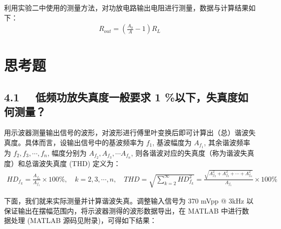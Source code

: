 \documentclass[UTF8]{article}
\begin{document}
利用实验二中使用的测量方法，对功放电路输出电阻进行测量，数据与计算结果如下：
\begin{gather}
    R_{out} = \left(\frac{A_0}{A} - 1\right)R_L 
\end{gather}


\begin{table}[H]\centering
    \caption{等效输出电阻测量数据与计算结果}
    \label{等效输出电阻测量数据与计算结果}
\end{table}



\section{思考题}

\subsection*{4.1 \ \ 低频功放失真度一般要求 1 \%以下，失真度如何测量？}

用示波器测量输出信号的波形，对波形进行傅里叶变换后即可计算出（总）谐波失真度。具体而言，设输出信号中的基波频率为 $f_1$, 基波幅度为 $A_{f_1}$, 其余谐波频率为 $f_2, f_3, \cdots, f_n$, 幅度分别为 $A_{f_2}, A_{f_3}, \cdots A_{f_n}$, 则各谐波对应的失真度（称为谐波失真度）和总谐波失真度 (THD) 定义为：
\begin{gather}
\label{eq: HD}
HD_{f_k} = \frac{A_{f_k}}{A_{f_1}} \times 100\% ,\quad k=2,3,\cdots,n
,\quad 
THD = \sqrt{\sum_{k=2}^{\infty} HD_{f_k}^2} 
= \frac{\sqrt{A_{f_2}^2 + A_{f_3}^2 + \cdots + A_{f_n}^2}}{A_{f_1}} \times 100\%
\end{gather}

下面，我们就来实际测量并计算谐波失真。调整输入信号为 370 mVpp @ 3kHz 以保证输出在摆幅范围内，将示波器测得的波形数据导出，在 MATLAB 中进行数据处理 (MATLAB 源码见附录)，可得如下结果：
\end{document}

